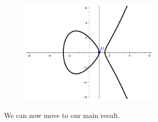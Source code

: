 \documentclass[]{math_paper}
\begin{document}
\begin{figure}[H]
    \centering
    \includegraphics[height = 2in]{media/curve_3.png}
    \label{fig:curve3}
\end{figure}

We can now move to our main result.
\end{document}
